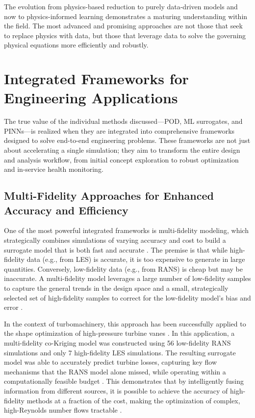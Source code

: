 \documentclass[dsc, EN]{ufabcFHZh}
\begin{document}
The evolution from physics-based reduction to purely data-driven models and now to physics-informed learning demonstrates a maturing understanding within the field. The most advanced and promising approaches are not those that seek to replace physics with data, but those that leverage data to solve the governing physical equations more efficiently and robustly.

\section{Integrated Frameworks for Engineering Applications}

The true value of the individual methods discussed—POD, ML surrogates, and PINNs—is realized when they are integrated into comprehensive frameworks designed to solve end-to-end engineering problems. These frameworks are not just about accelerating a single simulation; they aim to transform the entire design and analysis workflow, from initial concept exploration to robust optimization and in-service health monitoring.

\subsection{Multi-Fidelity Approaches for Enhanced Accuracy and Efficiency}

One of the most powerful integrated frameworks is multi-fidelity modeling, which strategically combines simulations of varying accuracy and cost to build a surrogate model that is both fast and accurate \citep{peherstorfer2018survey, multifidelity_simulation_wiki}. The premise is that while high-fidelity data (e.g., from LES) is accurate, it is too expensive to generate in large quantities. Conversely, low-fidelity data (e.g., from RANS) is cheap but may be inaccurate. A multi-fidelity model leverages a large number of low-fidelity samples to capture the general trends in the design space and a small, strategically selected set of high-fidelity samples to correct for the low-fidelity model's bias and error \citep{peherstorfer2018survey}.

In the context of turbomachinery, this approach has been successfully applied to the shape optimization of high-pressure turbine vanes \citep{synthesized2024}. In this application, a multi-fidelity co-Kriging model was constructed using 56 low-fidelity RANS simulations and only 7 high-fidelity LES simulations. The resulting surrogate model was able to accurately predict turbine losses, capturing key flow mechanisms that the RANS model alone missed, while operating within a computationally feasible budget \citep{synthesized2024}. This demonstrates that by intelligently fusing information from different sources, it is possible to achieve the accuracy of high-fidelity methods at a fraction of the cost, making the optimization of complex, high-Reynolds number flows tractable \citep{synthesized2024}.
\end{document}
